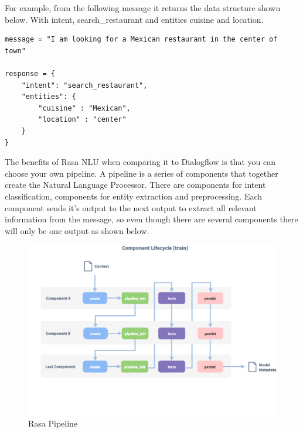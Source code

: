 For example, from the following message it returns the data structure shown below. With intent, search\_restaurant and entities cuisine and location.

\begin{lstlisting}
message = "I am looking for a Mexican restaurant in the center of town"

response = {
	"intent": "search_restaurant",
	"entities": {
		"cuisine" : "Mexican",
		"location" : "center"
	}
}

\end{lstlisting}

The benefits of Rasa NLU when comparing it to Dialogflow is that you can choose your own pipeline. A pipeline is a series of components that together create the Natural Language Processor. There are components for intent classification, components for entity extraction and preprocessing. Each component sends it’s output to the next output to extract all relevant information from the message, so even though there are several components there will only be one output as shown below.

\begin{center}
	\begin{figure}[h!]
		\centering
		\includegraphics[scale=0.4]{./images/3-rasa-pipe}
		\caption{Rasa Pipeline}
		\label{rasa_pipe}
	\end{figure}
\end{center}

